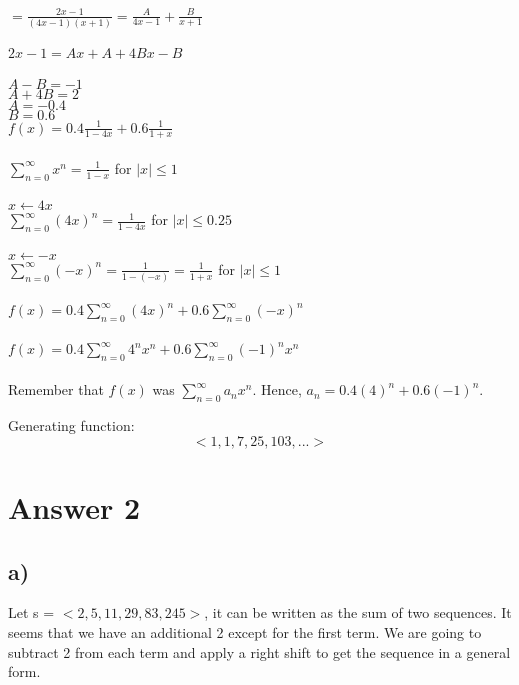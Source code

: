 \documentclass[12pt]{article}
\begin{document}
$= \frac{2x-1}{(4x-1)(x+1)} = \frac{A}{4x-1} + \frac{B}{x+1}$\\\\

$2x-1 = Ax + A + 4Bx - B$\\\\
$A-B = -1$\\
$A+4B = 2$\\
$A = -0.4$\\
$B = 0.6$\\

$f(x) = 0.4 \frac{1}{1-4x} + 0.6 \frac{1}{1+x}$\\\\

$\sum_{n=0}^{\infty}x^n = \frac{1}{1-x}$ for $|x| \leq 1$\\\\
$x \leftarrow 4x$\\
$\sum_{n=0}^{\infty}(4x)^n = \frac{1}{1-4x}$ for $|x| \leq 0.25$\\\\
$x \leftarrow -x$\\
$\sum_{n=0}^{\infty}(-x)^n = \frac{1}{1-(-x)} = \frac{1}{1+x}$ for $|x| \leq 1$\\\\

$f(x) = 0.4\sum_{n=0}^{\infty}(4x)^n + 0.6\sum_{n=0}^{\infty}(-x)^n$\\\\

$f(x) = 0.4\sum_{n=0}^{\infty}4^n x^n + 0.6\sum_{n=0}^{\infty} (-1)^n x^n$\\\\

Remember that $f(x)$ was $\sum_{n=0}^{\infty} a_n x^n$. Hence, $a_n = 0.4 (4)^n + 0.6 (-1)^n$.

Generating function: $$<1,1,7,25,103,...>$$

\section*{Answer 2}
\subsection*{a) }
Let s = $<2,5,11,29,83,245>$, it can be written as the sum of two sequences.
It seems that we have an additional 2 except for the first term. We are going to subtract 2 from each term and apply a right shift to get the sequence in a general form.\\\\
\end{document}
